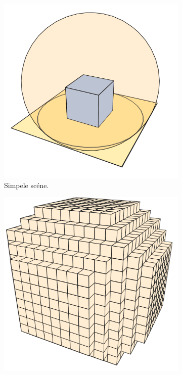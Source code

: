 \begin{figure}[t]
  \centering
  \begin{subfigure}[b]{0.39\textwidth}
    \centering
  \includegraphics[width=\textwidth]{./img/raw/besluit-geom/scene.png}
  \caption{Simpele sc\'ene.}
  \label{fig:vo-geometrie:0}
  \end{subfigure}%
  \begin{subfigure}[b]{0.39\textwidth}
    \centering
  \includegraphics[width=\textwidth]{./img/raw/besluit-geom/light.png}

\end{subfigure}
\end{figure}
